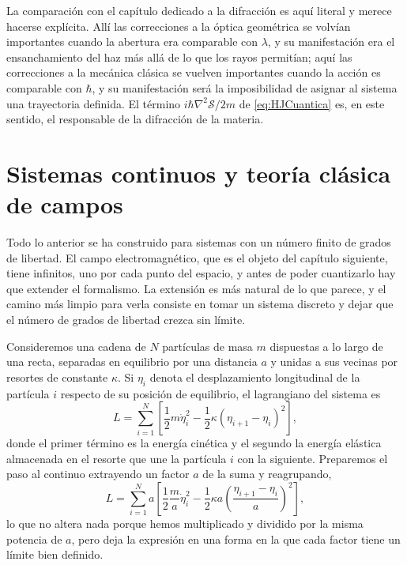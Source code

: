         La comparación con el capítulo dedicado a la difracción es aquí literal y merece hacerse explícita. Allí las correcciones a la óptica geométrica se volvían importantes cuando la abertura era comparable con $\lambda$, y su manifestación era el ensanchamiento del haz más allá de lo que los rayos permitían; aquí las correcciones a la mecánica clásica se vuelven importantes cuando la acción es comparable con $\hbar$, y su manifestación será la imposibilidad de asignar al sistema una trayectoria definida. El término $i\hbar\nabla^{2}\mathcal{S}/2m$ de \eqref{eq:HJCuantica} es, en este sentido, el responsable de la difracción de la materia.

\section{Sistemas continuos y teoría clásica de campos}

    Todo lo anterior se ha construido para sistemas con un número finito de grados de libertad. El campo electromagnético, que es el objeto del capítulo siguiente, tiene infinitos, uno por cada punto del espacio, y antes de poder cuantizarlo hay que extender el formalismo. La extensión es más natural de lo que parece, y el camino más limpio para verla consiste en tomar un sistema discreto y dejar que el número de grados de libertad crezca sin límite.

        Consideremos una cadena de $N$ partículas de masa $m$ dispuestas a lo largo de una recta, separadas en equilibrio por una distancia $a$ y unidas a sus vecinas por resortes de constante $\kappa$. Si $\eta_{i}$ denota el desplazamiento longitudinal de la partícula $i$ respecto de su posición de equilibrio, el lagrangiano del sistema es
        \begin{equation}\label{eq:LagrangianoCadena}
            L = \sum_{i=1}^{N}\left[\frac{1}{2}m\dot{\eta}_{i}^{2} - \frac{1}{2}\kappa\left(\eta_{i+1}-\eta_{i}\right)^{2}\right],
        \end{equation}
        donde el primer término es la energía cinética y el segundo la energía elástica almacenada en el resorte que une la partícula $i$ con la siguiente. Preparemos el paso al continuo extrayendo un factor $a$ de la suma y reagrupando,
        \begin{equation}\label{eq:LagrangianoCadena2}
            L = \sum_{i=1}^{N} a\left[\frac{1}{2}\frac{m}{a}\dot{\eta}_{i}^{2} - \frac{1}{2}\kappa a\left(\frac{\eta_{i+1}-\eta_{i}}{a}\right)^{2}\right],
        \end{equation}
        lo que no altera nada porque hemos multiplicado y dividido por la misma potencia de $a$, pero deja la expresión en una forma en la que cada factor tiene un límite bien definido.

